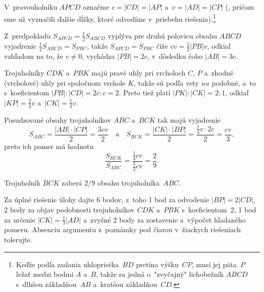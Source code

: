 {%
V~pravouholníku $APCD$ označme $c=|CD|=|AP|$ a~$v=|AD|=|CP|$
(\obr, pričom sme už
vyznačili ďalšie dĺžky, ktoré odvodíme v~priebehu riešenia).\footnote{Keďže
podľa zadania uhlopriečka~$BD$ pretína
výšku~$CP$, musí jej päta~$P$ ležať medzi bodmi $A$ a~$B$, takže
sa jedná o~"zvyčajný" lichobežník $ABCD$ s~dlhšou základňou~$AB$
a~kratšou základňou~$CD$.}
%

Z~predpokladu $S_{APCD}=\frac12 S_{ABCD}$ vyplýva pre druhú
polovicu obsahu $ABCD$ vyjadrenie $\frac12S_{ABCD}=S_{PBC}$, takže
$S_{APCD}=S_{PBC}$ čiže
$cv=\frac12|PB|v$, odkiaľ vzhľadom na to, že $v\ne0$, vychádza $|PB|=2c$,
v~dôsledku čoho $|AB|=3c$.

Trojuholníky $CDK$ a~$PBK$ majú pravé uhly pri vrcholoch $C$, $P$
a~zhodné (vrcholové) uhly pri spoločnom vrchole $K$, takže sú
podľa vety $uu$ podobné, a~to s~koeficientom $|PB|:|CD|=2c:c=2$.
Preto tiež platí $|PK|:|CK|=2:1$, odkiaľ $|KP|=\frac23v$
a~$|CK|=\frac13 v$.

Posudzované obsahy trojuholníkov $ABC$ a~$BCK$
tak majú vyjadrenie
$$
S_{ABC}=\frac{|AB|\cdot|CP|}{2}=\frac{3cv}{2}\quad\text{a}\quad
S_{BCK}=\frac{|CK|\cdot|BP|}{2}=\frac{\frac13v\cdot2c}{2}=
\frac{cv}{3},
$$
preto ich pomer má hodnotu
$$
\frac{S_{BCK}}{S_{ABC}}=\frac{\frac13cv}{\frac32cv}=\frac29.
$$

\odpoved
Trojuholník $BCK$ zaberá $2/9$ obsahu
trojuholníka~$ABC$.


\nobreak\medskip\petit\noindent
Za úplné riešenie úlohy dajte 6 bodov, z~toho 1 bod za odvodenie
$|BP|=2|CD|$, 2 body za objav podobnosti trojuholníkov $CDK$
a~$PBK$ s~koeficientom~2, 1 bod za určenie $|CK|=\frac13|AD|$
a~zvyšné 2 body za zostavenie a~výpočet hľadaného pomeru.
Absenciu argumentu z~poznámky pod čiarou v~žiackych riešeniach
tolerujte.

\endpetit
\bigbreak
}

